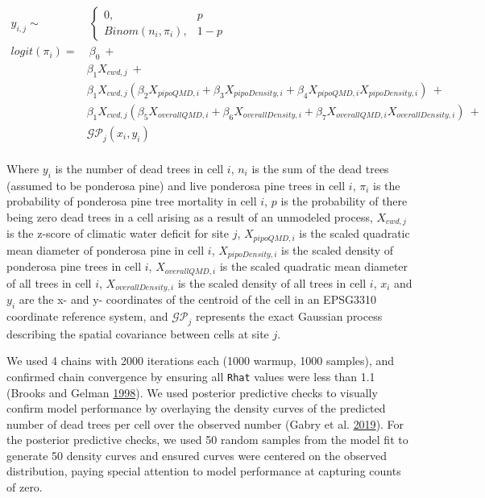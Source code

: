 \documentclass[twoside,12pt,final]{ucthesis-CA2012}
\begin{document}
\begin{ucmainmatter}
\[
\begin{aligned}
y_{i,j} \sim &\ \begin{cases}
0, & p \\
Binom(n_i, \pi_i), & 1-p
\end{cases} \\
logit(\pi_i) = &\ \beta_0\ + \\
& \beta_1X_{cwd, j}\ + \\
& \beta_1X_{cwd, j}(\beta_2X_{pipoQMD, i} + \beta_3X_{pipoDensity, i} + \beta_4X_{pipoQMD, i}X_{pipoDensity, i})\ + \\ 
& \beta_1X_{cwd, j}(\beta_5X_{overallQMD, i} + \beta_6X_{overallDensity, i} + \beta_7X_{overallQMD, i}X_{overallDensity, i})\ + \\
& \mathcal{GP}_j(x_i, y_i) \\
\end{aligned}
\]

Where \(y_i\) is the number of dead trees in cell \(i\), \(n_i\) is the
sum of the dead trees (assumed to be ponderosa pine) and live ponderosa
pine trees in cell \(i\), \(\pi_i\) is the probability of ponderosa pine
tree mortality in cell \(i\), \(p\) is the probability of there being
zero dead trees in a cell arising as a result of an unmodeled process,
\(X_{cwd, j}\) is the z-score of climatic water deficit for site \(j\),
\(X_{pipoQMD, i}\) is the scaled quadratic mean diameter of ponderosa
pine in cell \(i\), \(X_{pipoDensity, i}\) is the scaled density of
ponderosa pine trees in cell \(i\), \(X_{overallQMD, i}\) is the scaled
quadratic mean diameter of all trees in cell \(i\),
\(X_{overallDensity, i}\) is the scaled density of all trees in cell
\(i\), \(x_i\) and \(y_i\) are the x- and y- coordinates of the centroid
of the cell in an EPSG3310 coordinate reference system, and
\(\mathcal{GP}_j\) represents the exact Gaussian process describing the
spatial covariance between cells at site \(j\).

We used 4 chains with 2000 iterations each (1000 warmup, 1000 samples),
and confirmed chain convergence by ensuring all \texttt{Rhat} values
were less than 1.1 (Brooks and Gelman
\protect\hyperlink{ref-brooks1998}{1998}). We used posterior predictive
checks to visually confirm model performance by overlaying the density
curves of the predicted number of dead trees per cell over the observed
number (Gabry et al. \protect\hyperlink{ref-gabry2019}{2019}). For the
posterior predictive checks, we used 50 random samples from the model
fit to generate 50 density curves and ensured curves were centered on
the observed distribution, paying special attention to model performance
at capturing counts of zero.


\end{ucmainmatter}
\end{document}
